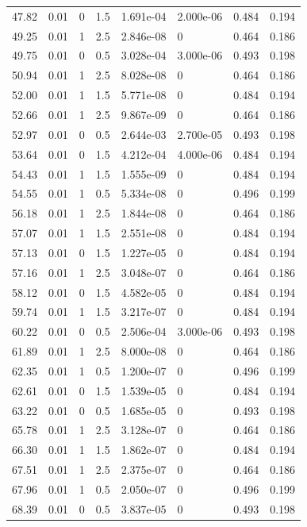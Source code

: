 \documentclass[preview]{standalone}
\begin{document}
{{{\begin{tabular}{L{1.2cm}C{1.2cm} C{0.3cm}C{0.5cm} C{1.4cm}C{1.4cm} C{1.4cm}C{1.4cm}}
  47.82  &  0.01  & 0     & 1.5 &  1.691e-04  & 2.000e-06  & 0.484 &  0.194   \\ 
  49.25  &  0.01  & 1     & 2.5 &  2.846e-08  & 0  & 0.464 &  0.186   \\ 
  49.75  &  0.01  & 0     & 0.5 &  3.028e-04  & 3.000e-06  & 0.493 &  0.198   \\ 
  50.94  &  0.01  & 1     & 2.5 &  8.028e-08  & 0  & 0.464 &  0.186   \\ 
  52.00  &  0.01  & 1     & 1.5 &  5.771e-08  & 0  & 0.484 &  0.194   \\ 
  52.66  &  0.01  & 1     & 2.5 &  9.867e-09  & 0  & 0.464 &  0.186   \\ 
  52.97  &  0.01  & 0     & 0.5 &  2.644e-03  & 2.700e-05  & 0.493 &  0.198   \\ 
  53.64  &  0.01  & 0     & 1.5 &  4.212e-04  & 4.000e-06  & 0.484 &  0.194   \\ 
  54.43  &  0.01  & 1     & 1.5 &  1.555e-09  & 0  & 0.484 &  0.194   \\ 
  54.55  &  0.01  & 1     & 0.5 &  5.334e-08  & 0  & 0.496 &  0.199   \\ 
  56.18  &  0.01  & 1     & 2.5 &  1.844e-08  & 0  & 0.464 &  0.186   \\ 
  57.07  &  0.01  & 1     & 1.5 &  2.551e-08  & 0  & 0.484 &  0.194   \\ 
  57.13  &  0.01  & 0     & 1.5 &  1.227e-05  & 0  & 0.484 &  0.194   \\ 
  57.16  &  0.01  & 1     & 2.5 &  3.048e-07  & 0  & 0.464 &  0.186   \\ 
  58.12  &  0.01  & 0     & 1.5 &  4.582e-05  & 0  & 0.484 &  0.194   \\ 
  59.74  &  0.01  & 1     & 1.5 &  3.217e-07  & 0  & 0.484 &  0.194   \\ 
  60.22  &  0.01  & 0     & 0.5 &  2.506e-04  & 3.000e-06  & 0.493 &  0.198   \\ 
  61.89  &  0.01  & 1     & 2.5 &  8.000e-08  & 0  & 0.464 &  0.186   \\ 
  62.35  &  0.01  & 1     & 0.5 &  1.200e-07  & 0  & 0.496 &  0.199   \\ 
  62.61  &  0.01  & 0     & 1.5 &  1.539e-05  & 0  & 0.484 &  0.194   \\ 
  63.22  &  0.01  & 0     & 0.5 &  1.685e-05  & 0  & 0.493 &  0.198   \\ 
  65.78  &  0.01  & 1     & 2.5 &  3.128e-07  & 0  & 0.464 &  0.186   \\ 
  66.30  &  0.01  & 1     & 1.5 &  1.862e-07  & 0  & 0.484 &  0.194   \\ 
  67.51  &  0.01  & 1     & 2.5 &  2.375e-07  & 0  & 0.464 &  0.186   \\ 
  67.96  &  0.01  & 1     & 0.5 &  2.050e-07  & 0  & 0.496 &  0.199   \\ 
  68.39  &  0.01  & 0     & 0.5 &  3.837e-05  & 0  & 0.493 &  0.198   \\ 
\hline 
\end{tabular} 

}}}
\end{document}

